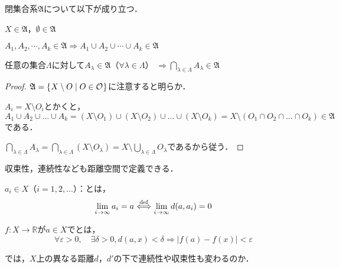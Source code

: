 \documentclass[uplatex]{jsarticle}
\begin{document}
\begin{prop}
    閉集合系$\mathfrak{A}$について以下が成り立つ．\par
     $X \in \mathfrak{A}$，$\emptyset \in \mathfrak{A}$\par
     $A_{1}, A_{2}, \cdots, A_{k} \in \mathfrak{A} \Longrightarrow A_{1} \cup A_{2} \cup \cdots \cup A_{k} \in \mathfrak{A}$\par
     任意の集合$\Lambda$に対して$A_{\lambda} \in \mathfrak{A}$（$\forall \lambda \in \Lambda$） ${\displaystyle \Longrightarrow \bigcap_{\lambda \in \Lambda} A_{\lambda} \in \mathfrak{A}}$
\end{prop}

\begin{proof}
     $\mathfrak{A} = \Set{\hspace{-1.8pt}  X \setminus O | O \in \mathcal{O} \hspace{-1.8pt}}$に注意すると明らか．

     $A_{i} = X \setminus O_{i}$とかくと，
    \begin{equation*}
        A_{1} \cup A_{2} \cup \dots \cup A_{k}
        = (X \setminus O_{1}) \cup (X \setminus O_{2}) \cup \dots \cup (X \setminus O_{k})
        = X \setminus (O_{1} \cap O_{2} \cap \dots \cap O_{k}) \in \mathfrak{A}
    \end{equation*}
    である．

     ${\displaystyle \bigcap_{\lambda \in \Lambda} A_{\lambda} = \bigcap_{\lambda \in \Lambda} (X \setminus O_{\lambda}) = X \setminus \bigcup_{\lambda \in \Lambda} O_{\lambda}}$であるから従う．
\end{proof}

収束性，連続性なども距離空間で定義できる．

\begin{teigi}
     $a_{i} \in X$（$i=1,2,\dots$）：とは，
    \begin{equation}
        \lim_{i \to \infty} a_{i} = a \overset{\mathrm{def}}{\Longleftrightarrow} \lim_{i \to \infty} d(a, a_{i}) = 0
    \end{equation}
    
     $f:X \longrightarrow \mathbb{R}$が$a \in X$でとは，
    \begin{equation}
        \forall \varepsilon > 0, \quad \exists \delta > 0, d(a,x) < \delta \Longrightarrow \left| f(a) - f(x) \right| < \varepsilon
    \end{equation}
\end{teigi}

では，$X$上の異なる距離$d$，$d'$の下で連続性や収束性も変わるのか．
\end{document}
